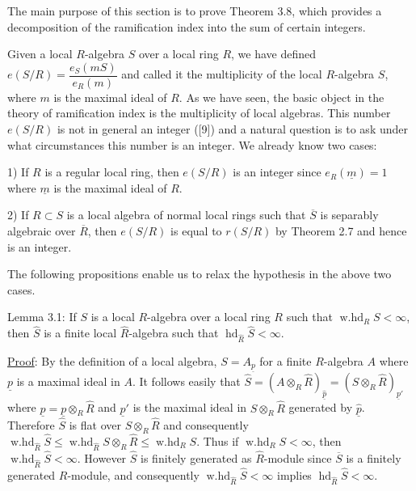 The main purpose of this section is to prove Theorem 3.8, which provides
a decomposition of the ramification index into the sum of certain integers.

Given a local $R$-algebra $S$ over a local ring $R$, we have defined
$e(S/R)=\dfrac{e_S(mS)}{e_R(m)}$ and called it the multiplicity of the local $R$-algebra
$S$, where $m$ is the maximal ideal of $R$. As we have seen, the basic object
in the theory of ramification index is the multiplicity of local algebras.
This number $e(S/R)$ is not in general an integer ([9]) and a natural
question is to ask under what circumstances this number is an integer.
We already know two cases:

1) If $R$ is a regular local ring, then $e(S/R)$ is an integer since
$e_R(\underline m)=1$ where $\underline m$ is the maximal ideal of $R$.

2) If $R\subset S$ is a local algebra of normal local rings such that $\overline S$ is
separably algebraic over $\overline R$, then $e(S/R)$ is equal to $r(S/R)$ by Theorem 2.7
and hence is an integer.

The following propositions enable us to relax the hypothesis in the
above two cases.

Lemma 3.1: If $S$ is a local $R$-algebra over a local ring $R$ such that
$\operatorname{w.hd}_R S<\infty$, then $\widehat S$ is a finite local $\widehat R$-algebra such that $\operatorname{hd}_{\widehat R}\widehat S<\infty$.

\uline{Proof}: By the definition of a local algebra, $S=A_{\underline p}$ for a finite
$R$-algebra $A$ where $\underline p$ is a maximal ideal in $A$. It follows easily that
$\widehat S=(A\otimes_R\widehat R)_{\widehat{\underline p}}=(S\otimes_R\widehat R)_{\underline p'}$ where $\widehat{\underline p}=\underline p\otimes_R\widehat R$ and $\underline p'$ is the maximal ideal
in $S\otimes_R\widehat R$ generated by $\widehat{\underline p}$. Therefore $\widehat S$ is flat over $S\otimes_R\widehat R$ and consequently
$\operatorname{w.hd}_{\widehat R}\widehat S\leq\operatorname{w.hd}_{\widehat R}S\otimes_R\widehat R\leq\operatorname{w.hd}_R S$.
Thus if $\operatorname{w.hd}_R S<\infty$, then $\operatorname{w.hd}_{\widehat R}\widehat S<\infty$.
However $\widehat S$ is finitely generated as $\widehat R$-module since $\overline S$ is a finitely generated
$R$-module, and consequently $\operatorname{w.hd}_{\widehat R}\widehat S<\infty$ implies $\operatorname{hd}_{\widehat R}\widehat S<\infty$.

